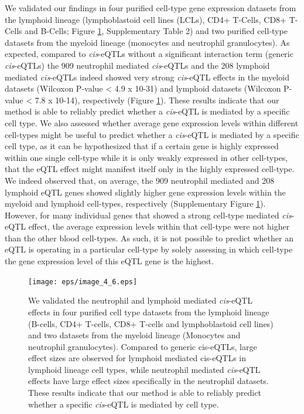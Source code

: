   We validated our findings in four purified cell-type gene expression datasets from the lymphoid 
  lineage (lymphoblastoid cell lines (LCLs), CD4+ T-Cells, CD8+ T-Cells and B-Cells; Figure \ref{fig:fig4_6}, 
  Supplementary Table 2) and two purified cell-type datasets from the myeloid lineage (monocytes and 
  neutrophil granulocytes). As expected, compared to \emph{cis}-eQTLs without a significant interaction term 
  (generic \emph{cis}-eQTLs) the 909 neutrophil mediated \emph{cis}-eQTLs and the 208 lymphoid mediated \emph{cis}-eQTLs 
  indeed showed very strong \emph{cis}-eQTL effects in the myeloid datasets (Wilcoxon P-value < 4.9 x 10-31) 
  and lymphoid datasets (Wilcoxon P-value < 7.8 x 10-14), respectively (Figure \ref{fig:fig4_6}). These results 
  indicate that our method is able to reliably predict whether a \emph{cis}-eQTL is mediated by a specific 
  cell type. We also assessed whether average gene expression levels within different cell-types might 
  be useful to predict whether a \emph{cis}-eQTL is mediated by a specific cell type, as it can be hypothesized 
  that if a certain gene is highly expressed within one single cell-type while it is only weakly 
  expressed in other cell-types, that the eQTL effect might manifest itself only in the highly expressed 
  cell-type. We indeed observed that, on average, the 909 neutrophil mediated and 208 lymphoid eQTL 
  genes showed slightly higher gene expression levels within the myeloid and lymphoid cell-types, 
  respectively (Supplementary Figure \ref{fig:fig4_6}). However, for many individual genes that showed a strong 
  cell-type mediated \emph{cis}-eQTL effect, the average expression levels within that cell-type were not 
  higher than the other blood cell-types. As such, it is not possible to predict whether an eQTL is 
  operating in a particular cell-type by solely assessing in which cell-type the gene expression level 
  of this eQTL gene is the highest.

  \begin{figure}[h!]
  \centering
  \texttt{[image: eps/image\_4\_6.eps]}
  \caption[Validation]{We validated the neutrophil and lymphoid mediated \emph{cis}-eQTL effects in four purified cell 
                       type datasets from the lymphoid lineage (B-cells, CD4+ T-cells, CD8+ T-cells and 
                       lymphoblastoid cell lines) and two datasets from the myeloid lineage (Monocytes and 
                       neutrophil granulocytes). Compared to generic cis-eQTLs, large effect sizes are observed 
                       for lymphoid mediated cis-eQTLs in lymphoid lineage cell types, while neutrophil mediated 
                       \emph{cis}-eQTL effects have large effect sizes specifically in the neutrophil datasets. These 
                       results indicate that our method is able to reliably predict whether a specific \emph{cis}-eQTL 
                       is mediated by cell type. }
          \label{fig:fig4_6}
  \end{figure}

